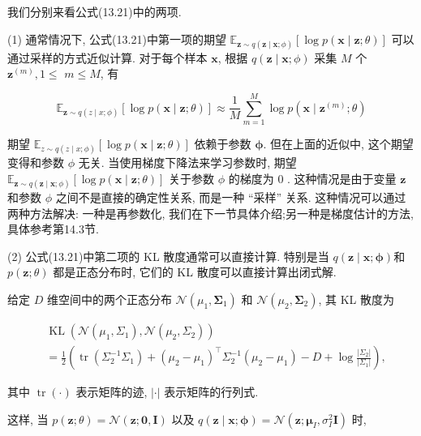 \documentclass[10pt]{article}
\begin{document}
我们分别来看公式(13.21)中的两项.

(1) 通常情况下, 公式(13.21)中第一项的期望 $\mathbb{E}_{\boldsymbol{z} \sim q(\boldsymbol{z} \mid \boldsymbol{x} ; \phi)}[\log p(\boldsymbol{x} \mid \boldsymbol{z} ; \theta)]$ 可以通过采样的方式近似计算. 对于每个样本 $\boldsymbol{x}$, 根据 $q(\boldsymbol{z} \mid \boldsymbol{x} ; \phi)$ 采集 $M$ 个 $\boldsymbol{z}^{(m)}, 1 \leq$ $m \leq M$, 有


\begin{equation*}
\mathbb{E}_{\boldsymbol{z} \sim q(z \mid x ; \phi)}[\log p(\boldsymbol{x} \mid \boldsymbol{z} ; \theta)] \approx \frac{1}{M} \sum_{m=1}^{M} \log p\left(\boldsymbol{x} \mid \boldsymbol{z}^{(m)} ; \theta\right) \tag{13.22}
\end{equation*}


期望 $\mathbb{E}_{z \sim q(z \mid x ; \phi)}[\log p(\boldsymbol{x} \mid \boldsymbol{z} ; \theta)]$ 依赖于参数 $\boldsymbol{\phi}$. 但在上面的近似中, 这个期望变得和参数 $\phi$ 无关. 当使用梯度下降法来学习参数时, 期望 $\mathbb{E}_{\boldsymbol{z} \sim q(\boldsymbol{z} \mid \boldsymbol{x} ; \phi)}[\log p(\boldsymbol{x} \mid \boldsymbol{z} ; \theta)]$ 关于参数 $\phi$ 的梯度为 0 . 这种情况是由于变量 $\boldsymbol{z}$ 和参数 $\phi$ 之间不是直接的确定性关系, 而是一种 “采样” 关系. 这种情况可以通过两种方法解决: 一种是再参数化, 我们在下一节具体介绍;另一种是梯度估计的方法,具体参考第14.3节.

(2) 公式(13.21)中第二项的 KL 散度通常可以直接计算. 特别是当 $q(\boldsymbol{z} \mid \boldsymbol{x} ; \boldsymbol{\phi})$和 $p(\boldsymbol{z} ; \theta)$ 都是正态分布时, 它们的 KL 散度可以直接计算出闭式解.

给定 $D$ 维空间中的两个正态分布 $\mathcal{N}\left(\mu_{1}, \boldsymbol{\Sigma}_{1}\right)$ 和 $\mathcal{N}\left(\mu_{2}, \boldsymbol{\Sigma}_{2}\right)$, 其 KL 散度为


\begin{align*}
& \operatorname{KL}\left(\mathcal{N}\left(\mu_{1}, \Sigma_{1}\right), \mathcal{N}\left(\mu_{2}, \Sigma_{2}\right)\right) \\
& =\frac{1}{2}\left(\operatorname{tr}\left(\Sigma_{2}^{-1} \Sigma_{1}\right)+\left(\mu_{2}-\mu_{1}\right)^{\top} \Sigma_{2}^{-1}\left(\mu_{2}-\mu_{1}\right)-D+\log \frac{\left|\Sigma_{2}\right|}{\left|\Sigma_{1}\right|}\right), \tag{13.23}
\end{align*}


其中 $\operatorname{tr}(\cdot)$ 表示矩阵的迹, $|\cdot|$ 表示矩阵的行列式.

这样, 当 $p(\boldsymbol{z} ; \theta)=\mathcal{N}(\boldsymbol{z} ; \mathbf{0}, \boldsymbol{I})$ 以及 $q(\boldsymbol{z} \mid \boldsymbol{x} ; \boldsymbol{\phi})=\mathcal{N}\left(\boldsymbol{z} ; \boldsymbol{\mu}_{I}, \sigma_{I}^{2} \boldsymbol{I}\right)$ 时,
\end{document}
